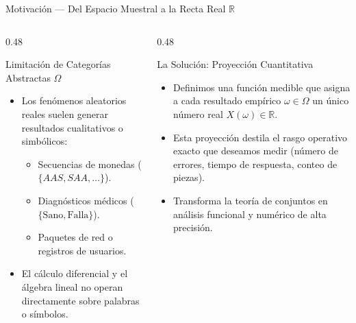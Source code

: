 \documentclass[10pt, aspectratio=169]{beamer}
\begin{document}
\begin{frame}{Motivación — Del Espacio Muestral a la Recta Real $\mathbb{R}$}
  \begin{columns}[T]
    \begin{column}{0.48\textwidth}
      \begin{block}{Limitación de Categorías Abstractas $\Omega$}
        \small
        \begin{itemize}\itemsep=0.1cm
          \item Los fenómenos aleatorios reales suelen generar resultados cualitativos o simbólicos:
          \begin{itemize}
            \item Secuencias de monedas ($\{AAS, SAA, \dots\}$).
            \item Diagnósticos médicos ($\{\text{Sano}, \text{Falla}\}$).
            \item Paquetes de red o registros de usuarios.
          \end{itemize}
          \item El cálculo diferencial y el álgebra lineal no operan directamente sobre palabras o símbolos.
        \end{itemize}
      \end{block}
    \end{column}
    \begin{column}{0.48\textwidth}
      \begin{alertblock}{La Solución: Proyección Cuantitativa}
        \small
        \begin{itemize}\itemsep=0.1cm
          \item Definimos una función medible que asigna a cada resultado empírico $\omega \in \Omega$ un único número real $X(\omega) \in \mathbb{R}$.
          \item Esta proyección destila el rasgo operativo exacto que deseamos medir (número de errores, tiempo de respuesta, conteo de piezas).
          \item Transforma la teoría de conjuntos en análisis funcional y numérico de alta precisión.
        \end{itemize}
      \end{alertblock}
    \end{column}
  \end{columns}
\end{frame}
\end{document}
